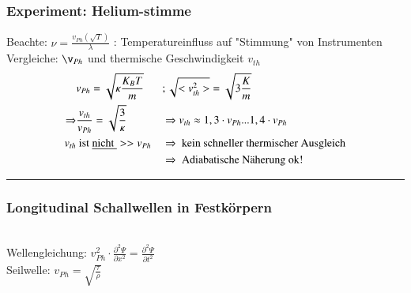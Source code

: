\subsubsection{Experiment: Helium-stimme}\enter
Beachte: $ \nu = \frac{v_{Ph}(\sqrt{T})}{\lambda} $ : Temperatureinfluss auf "Stimmung" von Instrumenten \\
Vergleiche: $ \v_{Ph} $ und thermische Geschwindigkeit $ v_{th} $\\
\begin{align*}
&v_{Ph} = \sqrt{\kappa\frac{K_BT}{m}} &&; \sqrt{<v_{th}^2>} = \sqrt{3\frac{K}{m}}\\
\Rightarrow &\frac{v_{th}}{v_{Ph}}=\sqrt{\frac{3}{\kappa}} &&\Rightarrow v_{th} \approx 1,3 \cdot v_{Ph} ... 1,4 \cdot v_{Ph}\\
 v_{th}&  \text{ ist \underline{nicht }}  >>  v_{Ph} &&\Rightarrow \text{ kein schneller thermischer Ausgleich}\\
 & &&\Rightarrow \text{ Adiabatische Näherung ok!}
\end{align*}
\begin{center}
	\rule{5cm}{.2pt}
\end{center}
\subsubsection{Longitudinal Schallwellen in Festkörpern}\hfill\\
Wellengleichung: $ v_{Ph}^2 \cdot \frac{\partial^2\Psi}{\partial x^2} = \frac{\partial^2\Psi}{\partial t^2} $\\
Seilwelle: $ v_{Ph} = \sqrt{\frac{\tau}{\rho}} $\\
